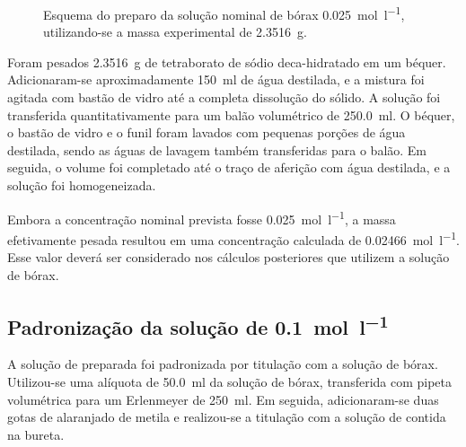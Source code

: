 \documentclass[a4paper,12pt]{article}
\begin{document}
\begin{figure}[H]
{%
}
\caption{Esquema do preparo da solução nominal de bórax \qty{0.025}{\mole\per\litre}, utilizando-se a massa experimental de \qty{2.3516}{\gram}.}
\label{fig:preparo_borax}
\end{figure}

Foram pesados \qty{2.3516}{\gram} de tetraborato de sódio deca-hidratado em um béquer. Adicionaram-se aproximadamente \qty{150}{\milli\litre} de água destilada, e a mistura foi agitada com bastão de vidro até a completa dissolução do sólido. A solução foi transferida quantitativamente para um balão volumétrico de \qty{250.0}{\milli\litre}. O béquer, o bastão de vidro e o funil foram lavados com pequenas porções de água destilada, sendo as águas de lavagem também transferidas para o balão. Em seguida, o volume foi completado até o traço de aferição com água destilada, e a solução foi homogeneizada.

\begin{tcolorbox}[
  title=Concentração da solução preparada,
  colback=quadrocinza,
  colframe=black!65,
  boxrule=0.6pt,
  arc=1mm
]
Embora a concentração nominal prevista fosse \qty{0.025}{\mole\per\litre}, a massa efetivamente pesada resultou em uma concentração calculada de \qty{0.02466}{\mole\per\litre}. Esse valor deverá ser considerado nos cálculos posteriores que utilizem a solução de bórax.
\end{tcolorbox}

\subsection{Padronização da solução de  \qty{0.1}{\mole\per\litre}}

A solução de  preparada foi padronizada por titulação com a solução de bórax. Utilizou-se uma alíquota de \qty{50.0}{\milli\litre} da solução de bórax, transferida com pipeta volumétrica para um Erlenmeyer de \qty{250}{\milli\litre}. Em seguida, adicionaram-se duas gotas de alaranjado de metila e realizou-se a titulação com a solução de  contida na bureta.
\end{document}
